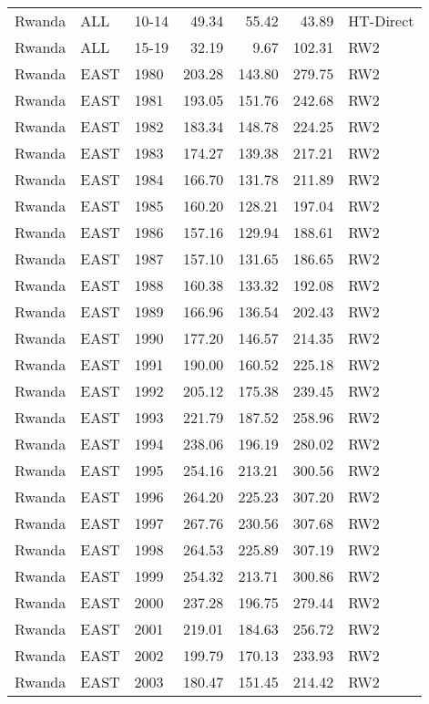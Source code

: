 \begin{longtable}{lllrrrl}
  Rwanda & ALL & 10-14 & 49.34 & 55.42 & 43.89 & HT-Direct \\ 
  Rwanda & ALL & 15-19 & 32.19 & 9.67 & 102.31 & RW2 \\ 
  Rwanda & EAST & 1980 & 203.28 & 143.80 & 279.75 & RW2 \\ 
  Rwanda & EAST & 1981 & 193.05 & 151.76 & 242.68 & RW2 \\ 
  Rwanda & EAST & 1982 & 183.34 & 148.78 & 224.25 & RW2 \\ 
  Rwanda & EAST & 1983 & 174.27 & 139.38 & 217.21 & RW2 \\ 
  Rwanda & EAST & 1984 & 166.70 & 131.78 & 211.89 & RW2 \\ 
  Rwanda & EAST & 1985 & 160.20 & 128.21 & 197.04 & RW2 \\ 
  Rwanda & EAST & 1986 & 157.16 & 129.94 & 188.61 & RW2 \\ 
  Rwanda & EAST & 1987 & 157.10 & 131.65 & 186.65 & RW2 \\ 
  Rwanda & EAST & 1988 & 160.38 & 133.32 & 192.08 & RW2 \\ 
  Rwanda & EAST & 1989 & 166.96 & 136.54 & 202.43 & RW2 \\ 
  Rwanda & EAST & 1990 & 177.20 & 146.57 & 214.35 & RW2 \\ 
  Rwanda & EAST & 1991 & 190.00 & 160.52 & 225.18 & RW2 \\ 
  Rwanda & EAST & 1992 & 205.12 & 175.38 & 239.45 & RW2 \\ 
  Rwanda & EAST & 1993 & 221.79 & 187.52 & 258.96 & RW2 \\ 
  Rwanda & EAST & 1994 & 238.06 & 196.19 & 280.02 & RW2 \\ 
  Rwanda & EAST & 1995 & 254.16 & 213.21 & 300.56 & RW2 \\ 
  Rwanda & EAST & 1996 & 264.20 & 225.23 & 307.20 & RW2 \\ 
  Rwanda & EAST & 1997 & 267.76 & 230.56 & 307.68 & RW2 \\ 
  Rwanda & EAST & 1998 & 264.53 & 225.89 & 307.19 & RW2 \\ 
  Rwanda & EAST & 1999 & 254.32 & 213.71 & 300.86 & RW2 \\ 
  Rwanda & EAST & 2000 & 237.28 & 196.75 & 279.44 & RW2 \\ 
  Rwanda & EAST & 2001 & 219.01 & 184.63 & 256.72 & RW2 \\ 
  Rwanda & EAST & 2002 & 199.79 & 170.13 & 233.93 & RW2 \\ 
  Rwanda & EAST & 2003 & 180.47 & 151.45 & 214.42 & RW2 \\ 

\end{longtable}

